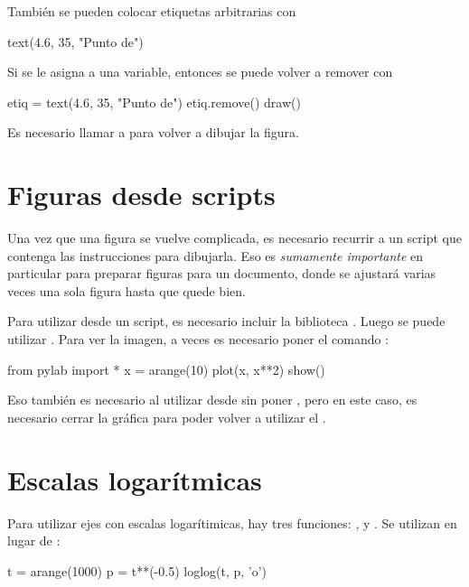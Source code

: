 También se pueden colocar etiquetas arbitrarias con
\begin{python}
text(4.6, 35, "Punto de\ninteres")
\end{python}
Si se le asigna a una variable, entonces se puede volver a remover con
\begin{python}
etiq = text(4.6, 35, "Punto de\ninteres")
etiq.remove()
draw()
\end{python}
Es necesario llamar a  para volver a dibujar la figura.

\section{Figuras desde scripts}
Una vez que una figura se vuelve complicada, es necesario recurrir a un script que contenga las instrucciones para dibujarla. Eso es \emph{sumamente importante} en particular para preparar figuras para un documento, donde se ajustará varias veces una sola figura hasta que quede bien.

Para utilizar  desde un script, es necesario incluir la biblioteca . Luego se puede utilizar . Para ver la imagen, a veces es necesario poner el comando :
\begin{python}
from pylab import *
x = arange(10)
plot(x, x**2)
show()
\end{python}


Eso también es necesario al utilizar  desde  sin poner , pero en este caso, es necesario cerrar la gráfica para poder volver a utilizar el .

\section{Escalas logarítmicas}
Para utilizar ejes con escalas logarítimicas, hay tres funciones: ,  y .
Se utilizan en lugar de :
\begin{python}
t = arange(1000)
p = t**(-0.5)
loglog(t, p, 'o')
\end{python}


